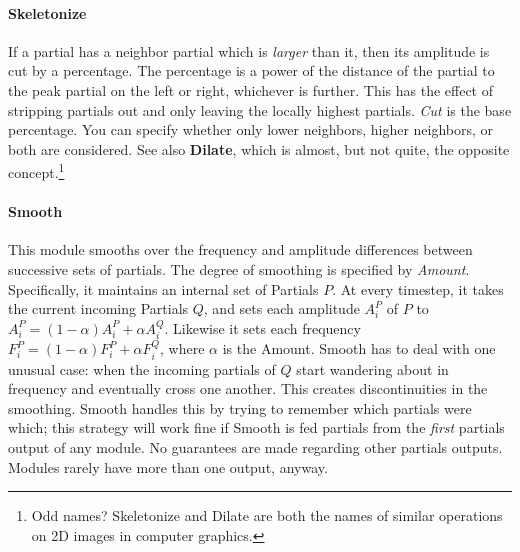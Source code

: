 \documentclass{article}
\begin{document}
\paragraph{Skeletonize} If a partial has a neighbor partial which is {\it larger} than it, then its amplitude is cut by a percentage.  The percentage is a power of the distance of the partial to the peak partial on the left or right, whichever is further.  This has the effect of stripping partials out and only leaving the locally highest partials.  {\it Cut} is the base percentage.  You can specify whether only lower neighbors, higher neighbors, or both are considered.  See also {\bf Dilate}, which is almost, but not quite, the opposite concept.\footnote{Odd names?  Skeletonize and Dilate are both the names of similar operations on 2D images in computer graphics.}

\paragraph{Smooth} This module smooths over the frequency and amplitude differences between successive sets of partials.  The degree of smoothing is specified by {\it Amount}.  Specifically, it maintains an internal set of Partials \(P\).  At every timestep, it takes the current incoming Partials \(Q\), and sets each amplitude \(A^P_i\) of \(P\) to \(A^P_i = (1-\alpha) A^P_i + \alpha A^Q_i\).  Likewise it sets each frequency \(F^P_i = (1-\alpha) F^P_i + \alpha F^Q_i\), where \(\alpha\) is the Amount.  Smooth has to deal with one unusual case: when the incoming partials of \(Q\) start wandering about in frequency and eventually cross one another.  This creates discontinuities in the smoothing.  Smooth handles this by trying to remember which partials were which; this strategy will work fine if Smooth is fed partials from the {\it first} partials output of any module.  No guarantees are made regarding other partials outputs.  Modules rarely have more than one output, anyway.

\end{document}
